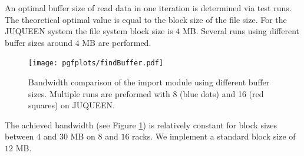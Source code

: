 An optimal buffer size of read data in one iteration is determined via test runs.
The theoretical optimal value is equal to the block size of the file size.
For the JUQUEEN system the file system block size is $4$ MB.
Several runs using different buffer sizes around $4$ MB are performed.
\begin{figure}[h!]
\begin{center}
 \texttt{[image: pgfplots/findBuffer.pdf]}
\end{center}
\caption{Bandwidth comparison of the import module using different buffer sizes.
Multiple runs are preformed with 8 (blue dots) and 16 (red squares) on JUQUEEN.}
\label{schumann:fig:findBuffer}
\end{figure}
The achieved bandwidth (see Figure \ref{schumann:fig:findBuffer}) is relatively constant for block sizes between $4$ and $30$ MB on $8$ and $16$ racks.
We implement a standard block size of $12$ MB.
